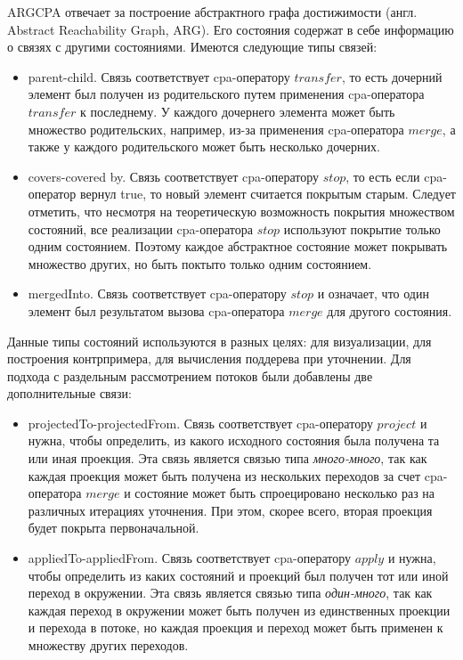 ARGCPA отвечает за построение абстрактного графа достижимости (англ. Abstract Reachability Graph, ARG). 
Его состояния содержат в себе информацию о связях с другими состояниями.
Имеются следующие типы связей:
\begin{itemize}
\item parent-child. Связь соответствует cpa-оператору $transfer$, то есть дочерний элемент был получен из родительского путем применения cpa-оператора $transfer$ к последнему. 
У каждого дочернего элемента может быть множество родительских, например, из-за применения cpa-оператора $merge$, а также у каждого родительского может быть несколько дочерних.
\item covers-covered by. Связь соответствует cpa-оператору $stop$, то есть если cpa-оператор вернул true, то новый элемент считается покрытым старым. 
Следует отметить, что несмотря на теоретическую возможность покрытия множеством состояний, все реализации cpa-оператора $stop$ используют покрытие только одним состоянием.
Поэтому каждое абстрактное состояние может покрывать множество других, но быть поктыто только одним состоянием.
\item mergedInto.  Связь соответствует cpa-оператору $stop$ и означает, что один элемент был результатом вызова cpa-оператора $merge$ для другого состояния.
\end{itemize}

Данные типы состояний используются в разных целях: для визуализации, для построения контрпримера, для вычисления поддерева при уточнении.
Для подхода с раздельным рассмотрением потоков были добавлены две дополнительные связи:
\begin{itemize}
\item projectedTo-projectedFrom. Связь соответствует cpa-оператору $project$ и нужна, чтобы определить, из какого исходного состояния была получена та или иная проекция.
Эта связь является связью типа \textit{много-много}, так как каждая проекция может быть получена из нескольких переходов за счет cpa-оператора $merge$ и состояние может быть спроецировано несколько раз на различных итерациях уточнения. 
При этом, скорее всего, вторая проекция будет покрыта первоначальной.
\item appliedTo-appliedFrom. Связь соответствует cpa-оператору $apply$ и нужна, чтобы определить из каких состояний и проекций был получен тот или иной переход в окружении.
Эта связь является связью типа \textit{один-много}, так как каждая переход в окружении может быть получен из единственных проекции и перехода в потоке, но каждая проекция и переход может быть применен к множеству других переходов.
\end{itemize}

